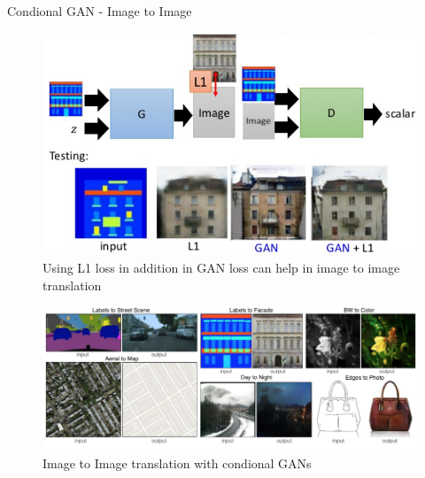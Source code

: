 \begin{frame}[allowframebreaks]{Condional GAN - Image to Image}

\begin{figure}
    \centering
    \includegraphics[height=0.75\textheight, width=\textwidth, keepaspectratio]{images/gan/cond_gan_3.png}
    \caption{Using L1 loss in addition in GAN loss can help in image to image translation}
\end{figure}

\framebreak

\begin{figure}
    \centering
    \includegraphics[height=0.8\textheight, width=\textwidth, keepaspectratio]{images/gan/cond_gan_4.png}
    \caption{Image to Image translation with condional GANs}
\end{figure}
    
\end{frame}